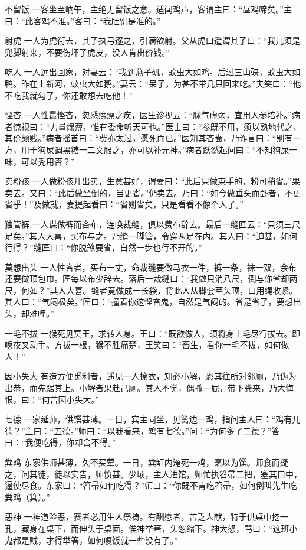 \documentclass[12pt,UTF8]{ctexbook}
\begin{document}
不留饭
一客坐至晌午，主绝无留饭之意。适闻鸡声，客谓主曰：“昼鸡啼矣。”主曰：“此客鸡不准。”客曰：“我肚饥是准的。”

射虎
一人为虎衔去，其子执弓逐之，引满欲射。父从虎口遥谓其子曰：“我儿须是兜脚射来，不要伤坏了虎皮，没人肯出价钱。”

吃人
一人远出回家，对妻云：“我到燕子矶，蚊虫大如鸡。后过三山硖，蚊虫大如鸭。昨在上新河，蚊虫大如鹅。”妻云：“呆子，为甚不带几只回来吃。”夫笑曰：“他不吃我就勾了，你还敢想去吃他！”

悭吝
一人性最悭吝，忽感痨瘵之疾，医生诊视云：“脉气虚弱，宜用人参培补。”病者惊视曰：“力量绵薄，惟有委命听天可也。”医士曰：“参既不用，须以熟地代之，其价颇贱。”病者摇首曰：“费亦太过，愿死而已。”医知其吝啬，乃诈言曰：“别有一方，用干狗屎调黑糖一二文服之，亦可以补元神。”病者跃然起问曰：“不知狗屎一味，可以秃用否？”

卖粉孩
一人做粉孩儿出卖，生意甚好，谓妻曰：“此后只做束手的，粉可稍省。”果卖去。又曰：“此后做坐倒的，当更省。”仍卖去。乃曰：“如今做垂头而卧者，不更省乎！”及做就，妻提起看曰：“省则省矣，只是看看不像个人了。”

独管裤
一人谋做裤而吝布，连唤裁缝，俱以费布辞去。最后一缝匠云：“只须三尺足矣。”其人大喜，买布与之。乃缝一脚管，令穿两足在内。其人曰：“迫甚，如何行得？”缝匠曰：“你脱煞要省，自然一步也行不开的。”

莫想出头
一人性吝者，买布一丈，命裁缝要做马衣一件，裤一条，袜一双，余布还要做顶包巾。匠每以布少辞去。落后一裁缝曰：“我做只消八尺，倒与你省却两尺，何如？”其人大喜。缝者竟做成一长袋，将此人从脚套至头顶，口用绳收紧。其人曰：“气闷极矣。”匠曰：“撞着你这悭吝鬼，自然是气闷的。省是省了，要想出头，却难哩。”

一毛不拔
一猴死见冥王，求转人身。王曰：“既欲做人，须将身上毛尽行拔去。”即唤夜叉动手。方拔一根，猴不胜痛楚，王笑曰：“畜生，看你一毛不拔，如何做人！”

因小失大
有造方便觅利者，遥见一人撩衣，知必小解，恐其往所对邻厕，乃伪为出恭，而先踞其上。小解者果赴己厕。其人不觉，偶撒一屁，带下粪来，乃大悔恨，曰：“何苦因小失大。”

七德
一家延师，供馔甚薄。一日，宾主同坐，见篱边一鸡，指问主人曰：“鸡有几德？”主曰：“五德。”师曰：“以我看来，鸡有七德。”问：“为何多了二德？”答曰：“我便吃得，你却舍不得。”

粪鸡
东家供师甚薄，久不买荤。一日，粪缸内淹死一鸡，烹以为馔。师食而疑之，问其徒，徒以实告，师愤甚。少顷，主人进馆，师忙执笤帚二把，塞其口中，逼使尽食。东家曰：“笤帚如何吃得？”师曰：“你既不肯吃笤帚，如何倒叫先生吃粪鸡（箕）。”

恶神
一神道险恶，赛者必用生人祭祷。有酬愿者，苦乏人献，特于供桌中挖一孔，藏身在桌下，而伸头于桌面。俟神举箸，头忽缩下。神大怒，骂曰：“这班小鬼都是贼，才得举箸，如何嗄饭就一些没有了。”
\end{document}
